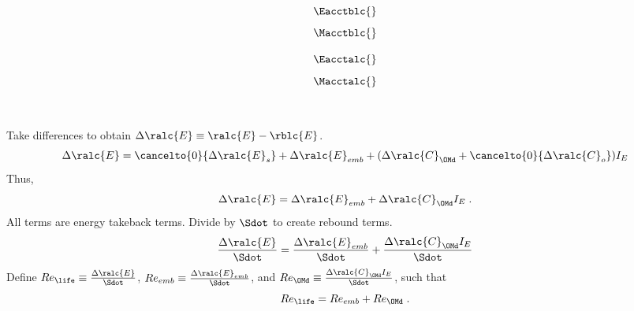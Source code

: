 

\begin{landscape}

\linespread{1}


\sectionsep{}

{
  \begin{equation}
  \Eacctblc{}
  \end{equation}
}
{
  \begin{equation}
  \Macctblc{}
  \end{equation}
}

\sectionsep{}

{
  \begin{equation}
  \Eacctalc{}
  \end{equation}
}
{
  \begin{equation}
  \Macctalc{}
  \end{equation}
}

\sectionsep{}

\derivsection{}
{
    ~
    
Take differences to obtain $\Delta \ralc{E} \equiv \ralc{E} - \rblc{E}$.
  \begin{equation}
  \Delta \ralc{E} = \cancelto{0}{\Delta \ralc{E}_s}
  + \Delta \ralc{E}_{emb}
  + (\Delta \ralc{C}_{\OMd} + \cancelto{0}{\Delta \ralc{C}_o}) I_E
  \end{equation}
  Thus, 
  \begin{equation}
  \Delta \ralc{E} = \Delta \ralc{E}_{emb} + \Delta \ralc{C}_{\OMd} I_E \; .
  \end{equation}
All terms are energy takeback terms.
Divide by $\Sdot$
to create rebound terms.
  \begin{equation}
  \frac{\Delta \ralc{E}}{\Sdot} = \frac{\Delta \ralc{E}_{emb}}{\Sdot} + \frac{\Delta \ralc{C}_{\OMd} I_E}{\Sdot}
  \end{equation}
  Define
  $Re_{\life} \equiv \frac{\Delta \ralc{E}}{\Sdot}$, 
  $Re_{emb} \equiv \frac{\Delta \ralc{E}_{emb}}{\Sdot}$, and
  $Re_{\OMd} \equiv \frac{\Delta \ralc{C}_{\OMd} I_E}{\Sdot}$,
  such that
  \begin{equation}
  Re_{\life} = Re_{emb} + Re_{\OMd} \; .
  \end{equation}
}
{
    ~
    
}
\end{landscape}
